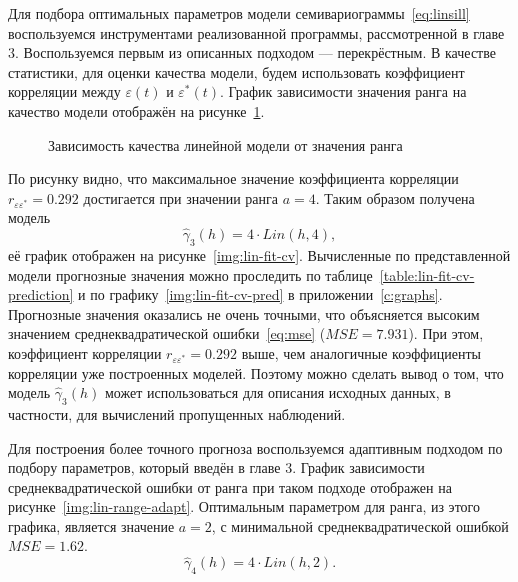 Для подбора оптимальных параметров модели семивариограммы~\eqref{eq:linsill} воспользуемся инструментами реализованной программы, рассмотренной в главе 3. Воспользуемся первым из описанных подходом --- перекрёстным. В качестве статистики, для оценки качества модели, будем использовать коэффициент корреляции между $ \varepsilon(t) $ и $ \varepsilon^{*}(t)$. График зависимости значения ранга на качество модели отображён на рисунке~\ref{img:lin-range-cv}.
\begin{figure}[ht]
\caption{Зависимость качества линейной модели от значения ранга}
\label{img:lin-range-cv}
\end{figure}
По рисунку видно, что максимальное значение коэффициента корреляции $ r_{\varepsilon\varepsilon^{*}} = 0.292 $ достигается при значении ранга $ a = 4 $. Таким образом получена модель
\begin{equation}
\label{eq:gamma3}
 	\widehat{\gamma}_3(h) = 4 \cdot Lin(h, 4),
\end{equation}
её график отображен на рисунке~\ref{img:lin-fit-cv}. Вычисленные по представленной модели прогнозные значения можно проследить по таблице~\ref{table:lin-fit-cv-prediction} и по графику~\ref{img:lin-fit-cv-pred} в приложении~\ref{c:graphs}. Прогнозные значения оказались не очень точными, что объясняется высоким значением среднеквадратической ошибки~\eqref{eq:mse} ($ MSE = 7.931 $). При этом, коэффициент корреляции $ r_{\varepsilon\varepsilon^{*}} = 0.292 $ выше, чем аналогичные коэффициенты корреляции уже построенных моделей. Поэтому можно сделать вывод о том, что модель $ \widehat{\gamma}_3(h) $ может использоваться для описания исходных данных, в частности, для вычислений пропущенных наблюдений.



Для построения более точного прогноза воспользуемся адаптивным подходом по подбору параметров, который введён в главе 3. График зависимости среднеквадратической ошибки от ранга при таком подходе отображен на рисунке~\ref{img:lin-range-adapt}. Оптимальным параметром для ранга, из этого графика, является значение $ a = 2 $, с минимальной среднеквадратической ошибкой $ MSE = 1.62 $.
\begin{equation}
\label{eq:gamma4}
 	\widehat{\gamma}_4(h) = 4 \cdot Lin(h, 2).
\end{equation}

